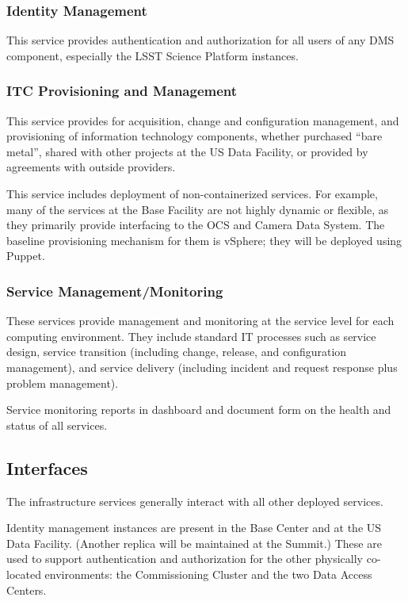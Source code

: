 \documentclass[DM,toc,lsstdraft]{lsstdoc}
\begin{document}
\subsubsection{Identity Management}\label{identity-management}

This service provides authentication and authorization for all users of
any DMS component, especially the LSST Science Platform instances.

\subsubsection{ITC Provisioning and Management}\label{itc-provisioning-management}

This service provides for acquisition, change and configuration management, and provisioning of information technology components, whether purchased ``bare metal'', shared with other projects at the US Data Facility, or provided by agreements with outside providers.

This service includes deployment of non-containerized services.
For example, many of the services at the Base Facility are not highly dynamic or flexible, as they primarily provide interfacing to the OCS and Camera Data System.
The baseline provisioning mechanism for them is vSphere; they will be deployed using Puppet.

\subsubsection{Service Management/Monitoring}\label{service-management-monitoring}

These services provide management and monitoring at the service level for each computing environment.
They include standard IT processes such as service design, service transition (including change, release, and configuration management), and service delivery (including incident and request response plus problem management).

Service monitoring reports in dashboard and document form on the health and status of all services.

\subsection{Interfaces}\label{infrastructure-interfaces}

The infrastructure services generally interact with all other deployed
services.

Identity management instances are present in the Base Center and at the US Data Facility.
(Another replica will be maintained at the Summit.)  These are used to support
authentication and authorization for the other physically co-located environments:
the Commissioning Cluster and the two Data Access Centers.
\end{document}
